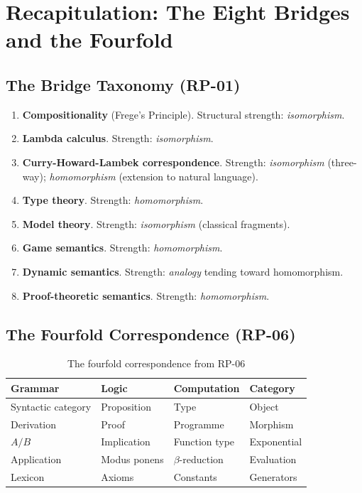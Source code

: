 \documentclass[12pt,a4paper]{article}
\begin{document}
\section{Recapitulation: The Eight Bridges and the Fourfold}

\subsection{The Bridge Taxonomy (RP-01)}

\begin{enumerate}
  \item \textbf{Compositionality} (Frege's Principle). Structural strength:
    \emph{isomorphism}.
  \item \textbf{Lambda calculus}. Strength: \emph{isomorphism}.
  \item \textbf{Curry-Howard-Lambek correspondence}. Strength:
    \emph{isomorphism} (three-way); \emph{homomorphism} (extension to natural
    language).
  \item \textbf{Type theory}. Strength: \emph{homomorphism}.
  \item \textbf{Model theory}. Strength: \emph{isomorphism} (classical
    fragments).
  \item \textbf{Game semantics}. Strength: \emph{homomorphism}.
  \item \textbf{Dynamic semantics}. Strength: \emph{analogy} tending toward
    homomorphism.
  \item \textbf{Proof-theoretic semantics}. Strength: \emph{homomorphism}.
\end{enumerate}

\subsection{The Fourfold Correspondence (RP-06)}

\begin{table}[ht]
\centering
\caption{The fourfold correspondence from RP-06}
\label{tab:fourfold}
\begin{tabular}{@{}llll@{}}
\toprule
Grammar & Logic & Computation & Category \\
\midrule
Syntactic category & Proposition & Type & Object \\
Derivation & Proof & Programme & Morphism \\
$A/B$ & Implication & Function type & Exponential \\
Application & Modus ponens & $\beta$-reduction & Evaluation \\
Lexicon & Axioms & Constants & Generators \\
\bottomrule
\end{tabular}
\end{table}
\end{document}
